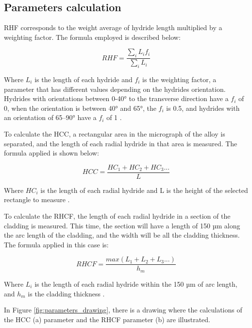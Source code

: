 
\subsection{Parameters calculation}


\noindent
RHF corresponds to the weight average of hydride length multiplied by a weighting factor. The formula employed is described below:


\begin{equation} \label{RHF_eqn}
RHF =  \frac{\sum_i L_i f_i }
            {\sum_i L_i}
\end{equation}


\noindent
Where $L_i$ is the length of each hydride and $f_i$ is the weighting factor, a parameter that has different values depending on the hydrides orientation. Hydrides with orientations between 0-40° to the transverse direction have a $f_i$ of 0, when the orientation is between 40° and 65°, the $f_i$ is 0.5, and hydrides with an orientation of 65–90° have a $f_i$ of 1 \cite{COLAS2013586}. 

\noindent
To calculate the HCC, a rectangular area in the micrograph of the alloy is separated, and the length of each radial hydride in that area is measured. The formula applied is shown below:

\begin{equation} \label{HCC_eqn}
HCC =  \frac{HC_1 + HC_2 + HC_3... }
            {L}
\end{equation}

\noindent
Where $HC_i$ is the length of each radial hydride and L is the height of the selected rectangle to measure \cite{SIMON2021152817}.

\noindent
To calculate the RHCF, the length of each radial hydride in a section of the cladding is measured. This time, the section will have a length of 150 µm along the arc length of the cladding, and the width will be all the cladding thickness. The formula applied in this case is:

\begin{equation} \label{RHCF_eqn}
RHCF =  \frac{max (L_1 + L_2 + L_3...) }
            {h_m}
\end{equation}

\noindent
Where $L_i$ is the length of each radial hydride within the 150 µm of arc length, and $h_m$ is the cladding thickness \cite{SIMON2021152817}.

In Figure \ref{fig:parameters_drawing}, there is a drawing where the calculations of the HCC (a) parameter and the RHCF parameter (b) are illustrated.

